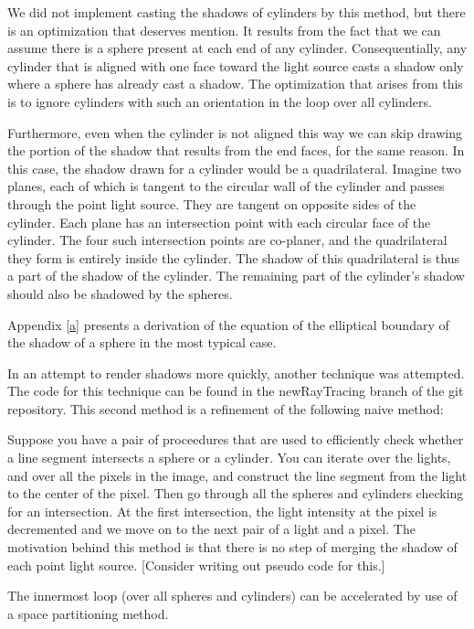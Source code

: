 \documentclass[10pt]{article}
\begin{document}
We did not implement casting the shadows of cylinders by this method, but there is an optimization that deserves mention. It results from the fact that we can assume there is a sphere present at each end of any cylinder. Consequentially, any cylinder that is aligned with one face toward the light source casts a shadow only where a sphere has already cast a shadow. The optimization that arises from this is to ignore cylinders with such an orientation in the loop over all cylinders.

Furthermore, even when the cylinder is not aligned this way we can skip drawing the portion of the shadow that results from the end faces, for the same reason. In this case, the shadow drawn for a cylinder would be a quadrilateral. Imagine two planes, each of which is tangent to the circular wall of the cylinder and passes through the point light source. They are tangent on opposite sides of the cylinder. Each plane has an intersection point with each circular face of the cylinder. The four such intersection points are co-planer, and the quadrilateral they form is entirely inside the cylinder. The shadow of this quadrilateral is thus a part of the shadow of the cylinder. The remaining part of the cylinder's shadow should also be shadowed by the spheres.

Appendix \ref{a} presents a derivation of the equation of the elliptical boundary of the shadow of a sphere in the most typical case.

In an attempt to render shadows more quickly, another technique was attempted. The code for this technique can be found in the newRayTracing branch of the git repository. This second method is a refinement of the following naive method:

Suppose you have a pair of proceedures that are used to efficiently check whether a line segment intersects a sphere or a cylinder. You can iterate over the lights, and over all the pixels in the image, and construct the line segment from the light to the center of the pixel. Then go through all the spheres and cylinders checking for an intersection. At the first intersection, the light intensity at the pixel is decremented and we move on to the next pair of a light and a pixel. The motivation behind this method is that there is no step of merging the shadow of each point light source. [Consider writing out pseudo code for this.]

The innermost loop (over all spheres and cylinders) can be accelerated by use of a space partitioning method.
\end{document}
